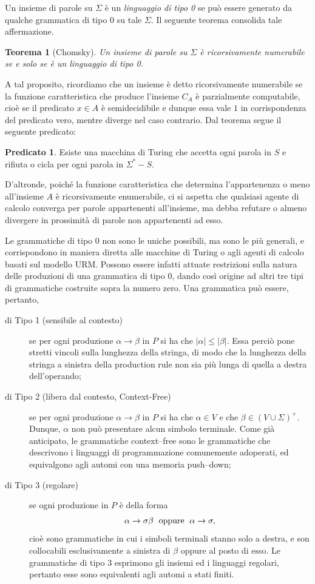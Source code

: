 \documentclass[10pt]{\classname}
\theoremstyle{newlinethm}
\newtheorem{thm}{Teorema}[section]
\theoremstyle{theorem}
\theoremstyle{definition}
\theoremstyle{definition}
\theoremstyle{definition}
\theoremstyle{definition}
\newtheorem{predicato}{Predicato}[section]
\begin{document}
Un insieme di parole su $\Sigma$ è un \emph{linguaggio di tipo 0} se può essere
generato da qualche grammatica di tipo 0 su tale $\Sigma$. Il seguente teorema
consolida tale affermazione.
\begin{thm}[Chomsky]
    Un insieme di parole su $\Sigma$ è \emph{ricorsivamente numerabile} se e
    solo se è un linguaggio di tipo 0.
\end{thm}
A tal proposito, ricordiamo che un insieme è detto ricorsivamente numerabile se la funzione caratteristica che produce l'insieme $C_A$ è parzialmente computabile, cioè se il predicato $x \in A$ è semidecidibile e dunque essa vale $1$ in corrispondenza del predicato vero, mentre diverge nel caso contrario. Dal teorema segue il seguente predicato:
\begin{predicato}
    Esiste una macchina di Turing che accetta ogni parola in $S$ e rifiuta o cicla per ogni parola in $\Sigma^* - S$.
\end{predicato}
D'altronde, poiché la funzione caratteristica che determina l'appartenenza o meno all'insieme $A$ è ricorsivamente enumerabile, ci si aspetta che qualsiasi agente di calcolo converga per parole appartenenti all'insieme, ma debba refutare o almeno divergere in prossimità di parole non appartenenti ad esso.

Le grammatiche di tipo 0 non sono le uniche possibili, ma sono le più generali, e corrispondono in maniera diretta alle macchine di Turing o agli agenti di calcolo basati sul modello URM. Possono essere infatti attuate restrizioni sulla natura delle produzioni di una grammatica di tipo 0, dando così origine ad altri tre tipi di grammatiche costruite sopra la numero zero. Una grammatica può essere, pertanto,
\begin{description}
    \item[di Tipo 1 (sensibile al contesto)] se per ogni produzione $\alpha \rightarrow \beta$ in $P$ si ha che $|\alpha| \leq |\beta|$. Essa perciò pone stretti vincoli sulla lunghezza della stringa, di modo che la lunghezza della stringa a sinistra della production rule non sia più lunga di quella a destra dell'operando;
    \item[di Tipo 2 (libera dal contesto, Context-Free)] se per ogni produzione $\alpha \rightarrow \beta$ in $P$ si ha che $\alpha \in V$ e che $\beta \in (V \cup \Sigma)^+$. Dunque, $\alpha$ non può presentare alcun simbolo terminale. Come già anticipato, le grammatiche context--free sono le grammatiche che descrivono i linguaggi di programmazione comunemente adoperati, ed equivalgono agli automi con una memoria push--down;
    \item[di Tipo 3 (regolare)] se ogni produzione in $P$ è della forma \[\alpha \rightarrow \sigma \beta \hspace*{0.1cm}\mbox{ oppure }\hspace*{0.1cm} \alpha \rightarrow \sigma,\] cioè sono grammatiche in cui i simboli terminali stanno solo a destra, e son collocabili esclusivamente a sinistra di $\beta$ oppure al posto di esso. Le grammatiche di tipo 3 esprimono gli insiemi ed i linguaggi regolari, pertanto esse sono equivalenti agli automi a stati finiti.
\end{description}
\end{document}
